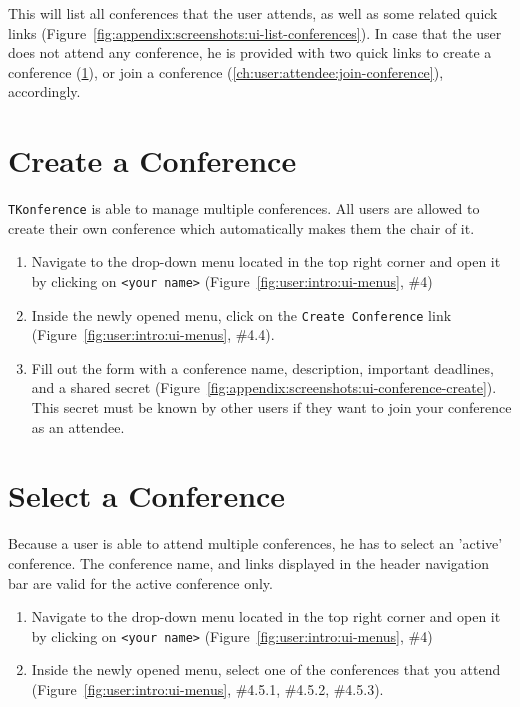 \documentclass[nochapterpage,nopartpage,noheadingspace,numbersubsubsec,bigchapter,colorback,accentcolor=tud9c,10pt]{tudreport}
\begin{document}
    \noindent
    This will list all conferences that the user attends, as well as some related quick links (Figure~\ref{fig:appendix:screenshots:ui-list-conferences}). In case that the user does not attend any conference, he is provided with two quick links to create a conference (\ref{ch:user:user:create-conference}), or join a conference (\ref{ch:user:attendee:join-conference}), accordingly.

  \section{Create a Conference}
  \label{ch:user:user:create-conference}

    \texttt{TKonference} is able to manage multiple conferences. All users are allowed to create their own conference which automatically makes them the chair of it.

        \begin{enumerate}
            \setlength\itemsep{0em}
            \item Navigate to the drop-down menu located in the top right corner and open it by clicking on \texttt{<your name>} (Figure~\ref{fig:user:intro:ui-menus}, \#4)
            \item Inside the newly opened menu, click on the \texttt{Create Conference} link (Figure~\ref{fig:user:intro:ui-menus}, \#4.4).
            \item Fill out the form with a conference name, description, important deadlines, and a shared secret (Figure~\ref{fig:appendix:screenshots:ui-conference-create}). This secret must be known by other users if they want to join your conference as an attendee.
        \end{enumerate}

  \section{Select a Conference}
  \label{ch:user:user:select-conference}

    Because a user is able to attend multiple conferences, he has to select an 'active' conference. The conference name, and links displayed in the header navigation bar are valid for the active conference only.

        \begin{enumerate}
            \setlength\itemsep{0em}
            \item Navigate to the drop-down menu located in the top right corner and open it by clicking on \texttt{<your name>} (Figure~\ref{fig:user:intro:ui-menus}, \#4)
            \item Inside the newly opened menu, select one of the conferences that you attend (Figure~\ref{fig:user:intro:ui-menus}, \#4.5.1, \#4.5.2, \#4.5.3).
        \end{enumerate}
\end{document}
